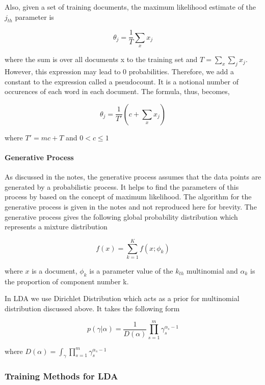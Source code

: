 \documentclass[11pt,a4paper,oneside]{article}
\begin{document}
Also, given a set of training documents, the maximum likelihood estimate of the $j_{th}$ parameter is

\begin{equation}
\theta_j = \frac{1}{T} \sum_x x_j
\end{equation}

where the sum is over all documents x to the training set and $T = \sum_x{\sum_j{x_j}} $. However, this expression may lead to $0$ probabilities. Therefore, we add a constant to the expression called a pseudocount. It is a notional number of occurences of each word in each document. The formula, thus, becomes,

\begin{equation}
\theta_j = \frac{1}{T'} (c + \sum_x x_j)
\end{equation}

where $T' = mc + T$ and $0 < c \leq 1 $

\paragraph{Generative Process}
As discussed in the notes, the generative process assumes that the data points are generated by a probabilistic process. It helps to find the parameters of this process by based on the concept of maximum likelihood. The algorithm for the generative process is given in the notes\cite{classNotes} and not reproduced here for brevity. The generative process gives the following global probability distribution which represents a mixture distribution

\begin{equation}
f(x) = \sum^K_{k=1}f(x;\phi_k)
\end{equation}

where $x$ is a document, $\phi_k$ is a parameter value of the $k_{th}$ multinomial and $\alpha_k$ is the proportion of component number k.

In LDA we use Dirichlet Distribution which acts as a prior for multinomial distribution discussed above. It takes the following form \cite{classNotes}

\begin{equation}
p(\gamma|\alpha) = \frac{1}{D(\alpha)}\prod^m_{s=1}\gamma^{\alpha_s - 1}_s
\end{equation}

where ${D(\alpha)} = \int_\gamma \prod^m_{s=1}\gamma^{\alpha_s - 1}_s$

\subsubsection{Training Methods for LDA}
\end{document}
